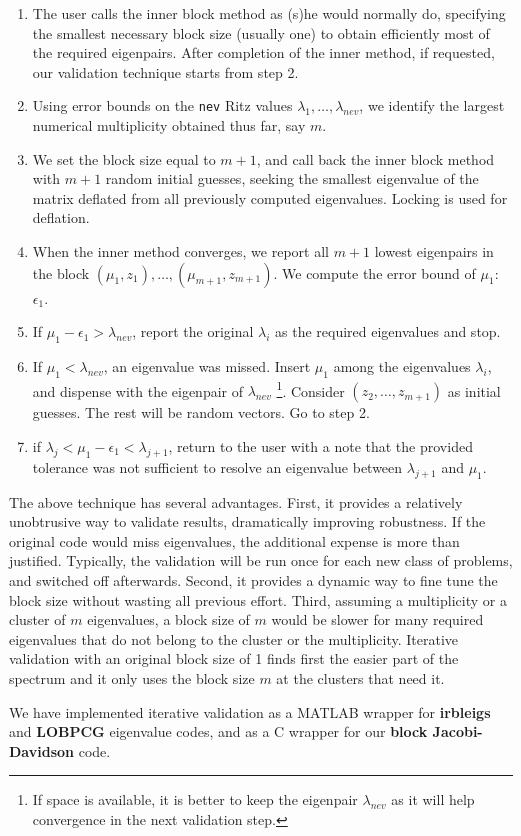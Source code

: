 \documentclass{report}
\begin{document}
\begin{enumerate}
\item
The user calls the inner block method as (s)he would normally do,
specifying the smallest necessary block size (usually one) to obtain
efficiently most of the required eigenpairs.
After completion of the inner method, if requested,
our validation technique starts from step 2.

\item
Using error bounds on the {\tt nev} Ritz values
$\lambda_1, \ldots , \lambda_{nev}$, we identify the largest
numerical multiplicity obtained thus far, say $m$.

\item
We set the block size equal to $m+1$, and call back the inner
block method with $m+1$ random initial guesses,
seeking the smallest eigenvalue of the matrix
deflated from all previously computed eigenvalues.
Locking is used for deflation.

\item
When the inner method converges, we report
all $m+1$ lowest eigenpairs in the block
$(\mu_1, z_1), \ldots , (\mu_{m+1}, z_{m+1})$.
We compute the error bound of $\mu_1$: $\epsilon_1$.

\item
If $\mu_1 - \epsilon_1 > \lambda_{nev}$, report the original $\lambda_i$
as the required eigenvalues and stop.

\item
If $\mu_1 < \lambda_{nev}$, an eigenvalue was missed.
Insert $\mu_1$ among the eigenvalues $\lambda_i$,
and dispense with the eigenpair of $\lambda_{nev}$
\footnote{If space is available, it is better to keep the
eigenpair $\lambda_{nev}$ as it will help convergence in the
next validation step.}.
Consider $(z_2, \ldots , z_{m+1})$ as initial guesses. The rest
will be random vectors.
Go to step 2.

\item
if $\lambda_j < \mu_1 - \epsilon_1 < \lambda_{j+1}$, return to the
user with a note that the provided tolerance
was not sufficient to resolve an eigenvalue between $\lambda_{j+1}$
and $\mu_1$.

\end{enumerate}

The above technique has several advantages.
First, it provides a relatively unobtrusive way to
validate results, dramatically improving robustness.
If the original code would miss eigenvalues,
the additional expense is more than justified.
Typically, the validation will be run once for each new class of
problems, and switched off afterwards.
Second, it provides a dynamic way to fine tune the block size without
wasting all previous effort.
Third, assuming a multiplicity or a cluster of $m$ eigenvalues,
a block size of $m$ would be slower for many
required eigenvalues that do not belong to the cluster or
the multiplicity.
Iterative validation with an original block size of 1 finds first
the easier part of the spectrum and it only uses the block size
$m$ at the clusters that need it.

We have implemented iterative validation as a MATLAB wrapper for
{\bf irbleigs} and {\bf LOBPCG} eigenvalue codes, and as a C
wrapper for our {\bf block Jacobi-Davidson} code.
\end{document}
